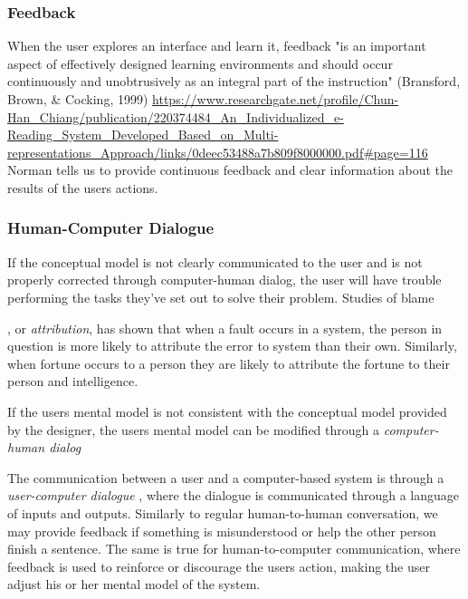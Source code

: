 
\subsubsection{Feedback}
When the user explores an interface and learn it, feedback "is an important aspect of effectively designed learning environments and should occur continuously and unobtrusively as an integral part of the instruction" (Bransford, Brown, \& Cocking, 1999) \url{https://www.researchgate.net/profile/Chun-Han_Chiang/publication/220374484_An_Individualized_e-Reading_System_Developed_Based_on_Multi-representations_Approach/links/0deec53488a7b809f8000000.pdf#page=116}
Norman \cite{Norman2013a} tells us to provide continuous feedback and clear information about the results of the users actions.

\subsubsection{Human-Computer Dialogue}

If the conceptual model is not clearly communicated to the user and is not properly corrected through computer-human dialog, the user will have trouble performing the tasks they've set out to solve their problem. Studies of blame , or \textit{attribution}, has shown that when a fault occurs in a system, the person in question is more likely to attribute the error to system than their own. Similarly, when fortune occurs to a person they are likely to attribute the fortune to their person and intelligence.

If the users mental model is not consistent with the conceptual model provided by the designer, the users mental model can be modified through a \textit{computer-human dialog}

The communication between a user and a computer-based system is through a \textit{user-computer dialogue} \cite{Foley1996}, where the dialogue is communicated through a language of inputs and outputs. Similarly to regular human-to-human conversation, we may provide feedback if something is misunderstood or help the other person finish a sentence. The same is true for human-to-computer communication, where feedback is used to reinforce or discourage the users action, making the user adjust his or her mental model of the system.

